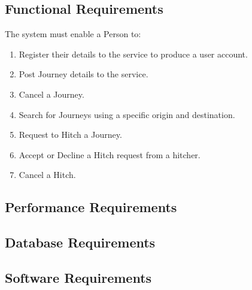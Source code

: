\documentclass[11pt]{article}
\begin{document}
\subsection{Functional Requirements}
The system must enable a Person to:
\begin{enumerate}
\item Register their details to the service to produce a user account.
\item Post Journey details to the service.
\item Cancel a Journey.
\item Search for Journeys using a specific origin and destination.
\item Request to Hitch a Journey.
\item Accept or Decline a Hitch request from a hitcher.
\item Cancel a Hitch.
\end{enumerate}
\subsection{Performance Requirements}
\subsection{Database Requirements}

\subsection{Software Requirements}
\end{document}
